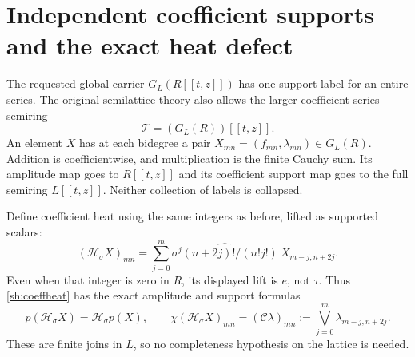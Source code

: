 \documentclass[11pt,a4paper]{article}
\theoremstyle{definition}\newtheorem{definition}[theorem]{Definition}
\providecommand{\Ht}{\mathcal H}
\begin{document}
\section{Independent coefficient supports and the exact heat defect}

The requested global carrier $G_L(R[[t,z]])$ has one support
label for an entire series. The original semilattice theory also
allows the larger coefficient-series semiring
\[
 \mathscr T=(G_L(R))[[t,z]].
\]
An element $X$ has at each bidegree a pair
$X_{mn}=(f_{mn},\lambda_{mn})\in G_L(R)$.
Addition is coefficientwise, and multiplication is the finite
Cauchy sum. Its amplitude map goes to $R[[t,z]]$ and its
coefficient support map goes to the full semiring $L[[t,z]]$.
Neither collection of labels is collapsed.

Define coefficient heat using the same integers as before,
lifted as supported scalars:
\begin{equation}\tag{SH31}\label{sh:coeffheat}
 (\mathscr H_\sigma X)_{mn}
 =\sum_{j=0}^m
 \widehat{\sigma^j(n+2j)!/(n!j!)}\ X_{m-j,n+2j}.
\end{equation}
Even when that integer is zero in $R$, its displayed lift is
$e$, not $\tau$. Thus \eqref{sh:coeffheat} has the exact
amplitude and support formulas
\begin{equation}\tag{SH32}\label{sh:coeffformula}
 p(\mathscr H_\sigma X)=\Ht_\sigma p(X),\qquad
 \chi(\mathscr H_\sigma X)_{mn}
       =(\mathcal C\lambda)_{mn}
       :=\bigvee_{j=0}^m\lambda_{m-j,n+2j}.
\end{equation}
These are finite joins in $L$, so no completeness hypothesis
on the lattice is needed.
\end{document}
